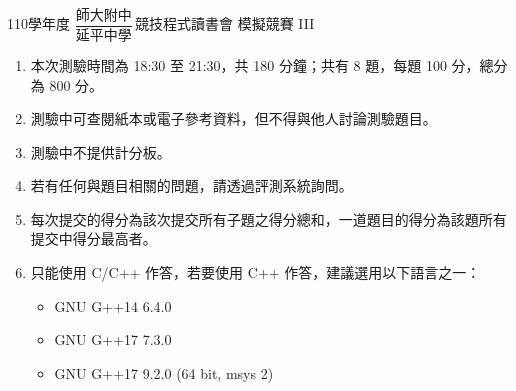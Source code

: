 \begin{center}
    \LARGE{\ProblemTitleFont 110學年度 $\dfrac{\text{師大附中}}{\text{延平中學}}\,\text{競技程式讀書會}$ 模擬競賽 III}\normalsize
\end{center}


\begin{enumerate}
    \item 本次測驗時間為 18:30 至 21:30，共 180 分鐘；共有 8 題，每題 100 分，總分為 800 分。
    \item 測驗中可查閱紙本或電子參考資料，但不得與他人討論測驗題目。
    \item 測驗中不提供計分板。
    \item 若有任何與題目相關的問題，請透過評測系統詢問。
    \item 每次提交的得分為該次提交所有子題之得分總和，一道題目的得分為該題所有提交中得分最高者。
    \item 只能使用 C/C++ 作答，若要使用 C++ 作答，建議選用以下語言之一：
    \begin{itemize}
        \item GNU G++14 6.4.0
        \item GNU G++17 7.3.0
        \item GNU G++17 9.2.0 (64 bit, msys 2)
    \end{itemize}
\end{enumerate}